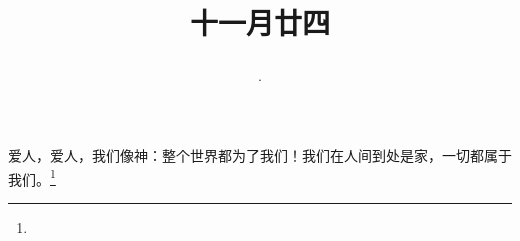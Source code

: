 \title{\date[d=5,m=1,y=2024][year:cn-y,年,month:cn,day:cn,日,·,weekday]·十一月廿四 }
爱人，爱人，我们像神：整个世界都为了我们！我们在人间到处是家，一切都属于我们。\footnote{ }

